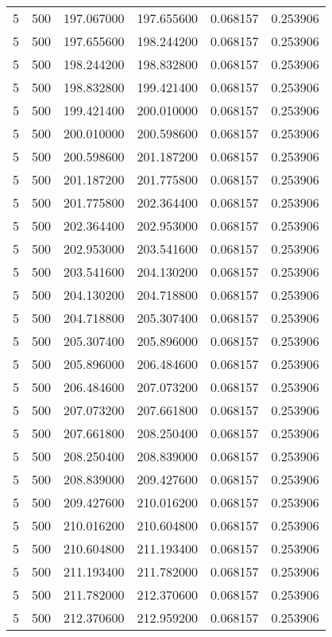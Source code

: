 \begin{longtable}{rrrrrr}
5 & 500 & 197.067000 & 197.655600 & 0.068157 & 0.253906 \\
5 & 500 & 197.655600 & 198.244200 & 0.068157 & 0.253906 \\
5 & 500 & 198.244200 & 198.832800 & 0.068157 & 0.253906 \\
5 & 500 & 198.832800 & 199.421400 & 0.068157 & 0.253906 \\
5 & 500 & 199.421400 & 200.010000 & 0.068157 & 0.253906 \\
5 & 500 & 200.010000 & 200.598600 & 0.068157 & 0.253906 \\
5 & 500 & 200.598600 & 201.187200 & 0.068157 & 0.253906 \\
5 & 500 & 201.187200 & 201.775800 & 0.068157 & 0.253906 \\
5 & 500 & 201.775800 & 202.364400 & 0.068157 & 0.253906 \\
5 & 500 & 202.364400 & 202.953000 & 0.068157 & 0.253906 \\
5 & 500 & 202.953000 & 203.541600 & 0.068157 & 0.253906 \\
5 & 500 & 203.541600 & 204.130200 & 0.068157 & 0.253906 \\
5 & 500 & 204.130200 & 204.718800 & 0.068157 & 0.253906 \\
5 & 500 & 204.718800 & 205.307400 & 0.068157 & 0.253906 \\
5 & 500 & 205.307400 & 205.896000 & 0.068157 & 0.253906 \\
5 & 500 & 205.896000 & 206.484600 & 0.068157 & 0.253906 \\
5 & 500 & 206.484600 & 207.073200 & 0.068157 & 0.253906 \\
5 & 500 & 207.073200 & 207.661800 & 0.068157 & 0.253906 \\
5 & 500 & 207.661800 & 208.250400 & 0.068157 & 0.253906 \\
5 & 500 & 208.250400 & 208.839000 & 0.068157 & 0.253906 \\
5 & 500 & 208.839000 & 209.427600 & 0.068157 & 0.253906 \\
5 & 500 & 209.427600 & 210.016200 & 0.068157 & 0.253906 \\
5 & 500 & 210.016200 & 210.604800 & 0.068157 & 0.253906 \\
5 & 500 & 210.604800 & 211.193400 & 0.068157 & 0.253906 \\
5 & 500 & 211.193400 & 211.782000 & 0.068157 & 0.253906 \\
5 & 500 & 211.782000 & 212.370600 & 0.068157 & 0.253906 \\
5 & 500 & 212.370600 & 212.959200 & 0.068157 & 0.253906 \\

\end{longtable}
